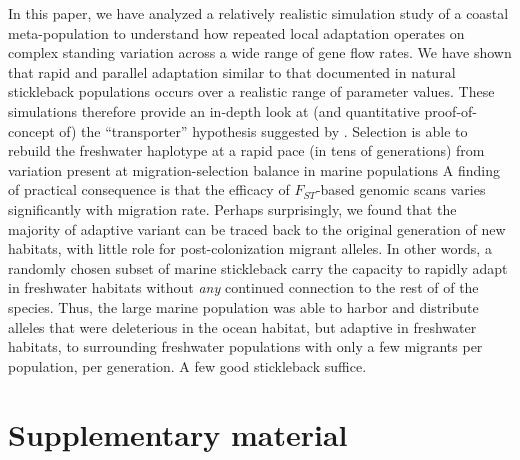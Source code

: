 \documentclass{article}
\begin{document}
In this paper, we have analyzed a relatively realistic simulation study of a coastal meta-population to 
understand how repeated local adaptation operates on complex standing variation across a wide range of gene flow rates.
We have shown that rapid and parallel adaptation similar to that documented in natural stickleback populations
occurs over a realistic range of parameter values.
These simulations therefore provide an in-depth look at (and quantitative proof-of-concept of)
the ``transporter'' hypothesis suggested by \citet{schluter2009genetics}.
Selection is able to rebuild the freshwater haplotype at a rapid pace (in tens of generations) from variation present at migration-selection balance in marine populations 
A finding of practical consequence is that the efficacy of $F_{ST}$-based genomic scans varies significantly with migration rate.
Perhaps surprisingly, we found that the majority of adaptive variant can be traced back to the original generation of new habitats,
with little role for post-colonization migrant alleles. 
In other words, a randomly chosen subset of marine stickleback carry the capacity to rapidly adapt in freshwater habitats without \emph{any} continued connection to the rest of of the species.
Thus, the large marine population was able to harbor and distribute alleles that were deleterious in the ocean habitat, but adaptive in freshwater habitats, to surrounding freshwater populations with only a few migrants per population, per generation. A few good stickleback suffice.



{}

\clearpage
\appendix
\setcounter{table}{0}
\renewcommand{\thetable}{S\arabic{table}}
\setcounter{figure}{0}
\renewcommand{\thefigure}{S\arabic{figure}}

\section*{Supplementary material}
\end{document}
